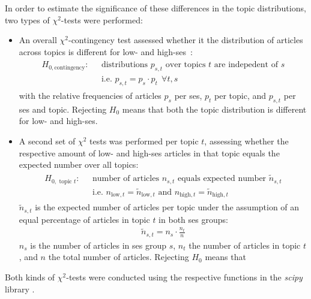In order to estimate the significance of these differences in the topic distributions, two types of $\chi^2$-tests were performed:
\begin{itemize}
    \item An overall $\chi^2$-contingency test assessed whether it the distribution of articles across topics is different for low- and high-\gls{ses}~\autocite[p. 430]{fahrmeir_spezielle_2016}:
    \begin{align}
        \begin{split}
            H_{0, \text{contingency}}: ~~~ &\text{distributions } p_{s, t} \text{ over topics } t \text{ are indepedent of } s\\
        & \text{i.e. } p_{s, t} = p_s \cdot p_t ~~ \forall t, s
        \end{split}
    \end{align}
    with the relative frequencies of articles $p_s$ per \gls{ses}, $p_t$ per topic, and $p_{s, t}$ per \gls{ses} and topic. Rejecting $H_0$ means that both the topic distribution is different for low- and high-\gls{ses}.

    \item A second set of $\chi^2$ tests was performed per topic $t$, assessing whether the respective amount of low- and high-\gls{ses} articles in that topic equals the expected number over all topics:
    \begin{align}
        \begin{split}
            H_{0, \text{ topic }t}: ~~~ &\text{number of articles } n_{s, t} \text{ equals expected number } \tilde n_{s, t} \\
            & \text{i.e. } n_{\text{low}, t} = \tilde n_{\text{low}, t} \text{ and } n_{\text{high}, t} = \tilde n_{\text{high}, t}
        \end{split}
    \end{align}
    $\tilde n_{s, t}$ is the expected number of articles per topic under the assumption of an equal percentage of articles in topic $t$ in both \gls{ses} groups:
    \begin{align}
        \tilde n_{s, t} = n_s \cdot \frac{n_t}{n}
    \end{align}
    $n_s$ is the number of articles in \gls{ses} group $s$, $n_t$ the number of articles in topic $t$, and $n$ the total number of articles. Rejecting $H_0$ means that 
\end{itemize}

Both kinds of $\chi^2$-tests were conducted using the respective functions in the \textit{scipy} library \autocite{scipychi2_scipy_nodate,scipychi2_contingency_scipy_nodate}.

